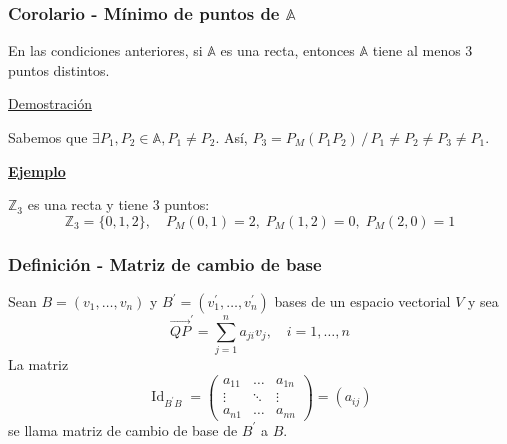 \documentclass[12pt, a4paper, ones, notitlepage, openany,titlepage]{article}
\newcommand{\demostracion}{\noindent\underline{Demostración}}
\newcommand{\ejemplo}{\noindent\underline{\textbf{Ejemplo}}}
\begin{document}
\subsubsection{Corolario - Mínimo de puntos de $\mathbb{A}$}
En las condiciones anteriores, si $\mathbb{A}$ es una recta, entonces $\mathbb{A}$ tiene al menos $3$ puntos distintos.

\demostracion

Sabemos que $\exists P_1, P_2 \in \mathbb{A}, P_1 \neq P_2$. Así, $P_3 = P_M(P_1 P_2) \,/\, P_1 \neq P_2 \neq P_3 \neq P_1$.

\ejemplo

$\mathbb{Z}_3$ es una recta y tiene $3$ puntos:
$$
\mathbb{Z}_3 = \{0,1,2\}, \quad P_M(0,1) = 2, \; P_M(1,2) = 0, \; P_M(2,0) = 1
$$

\subsubsection{Definición - Matriz de cambio de base}
\noindent Sean $B=\left(v_{1}, \ldots, v_{n}\right)$ y $B^{\prime}=\left(v_{1}^{\prime}, \ldots, v_{n}^{\prime}\right)$ bases de un espacio vectorial $V$ y sea
$$
\overrightarrow{QP}^{\prime}=\sum_{j=1}^{n} a_{j i} v_{j}, \quad i=1, \ldots, n
$$
La matriz
$$
\operatorname{Id}_{B^{\prime} B}=\left(\begin{array}{rrr}
	a_{11} & \ldots & a_{1 n} \\
	\vdots & \ddots & \vdots \\
	a_{n 1} & \ldots & a_{n n}
\end{array}\right)=\left(a_{i j}\right)
$$
se llama matriz de cambio de base de $B^{\prime}$ a $B$.
\end{document}
